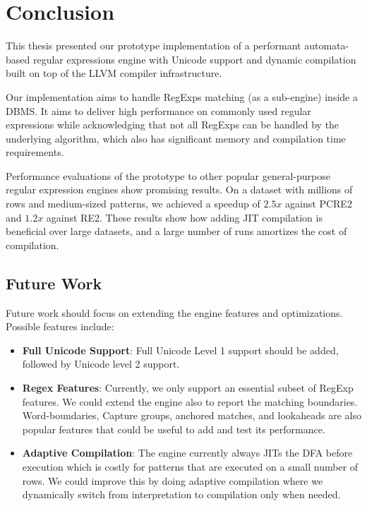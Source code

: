 \chapter{Conclusion}\label{chapter:conclusion}
This thesis presented our prototype implementation of a performant automata-based regular expressions engine with Unicode support and dynamic compilation built on top of the LLVM compiler infrastructure.

Our implementation aims to handle RegExps matching (as a sub-engine) inside a DBMS. It aims to deliver high performance on commonly used regular expressions while acknowledging that not all RegExps can be handled by the underlying algorithm, which also has significant memory and compilation time requirements.

Performance evaluations of the prototype to other popular general-purpose regular expression engines show promising results. On a dataset with millions of rows and medium-sized patterns, we achieved a speedup of $2.5x$ against PCRE2 and $1.2x$ against RE2. These results show how adding JIT compilation is beneficial over large datasets, and a large number of runs amortizes the cost of compilation.

\section{Future Work}\label{futurework}

Future work should focus on extending the engine features and optimizations. Possible features include:
\begin{itemize}
    \item \textbf{Full Unicode Support}: Full Unicode Level 1 support should be added, followed by Unicode level 2 support.
    \item \textbf{Regex Features}: Currently, we only support an essential subset of RegExp features. We could extend the engine also to report the matching boundaries. Word-boundaries, Capture groups, anchored matches, and lookaheads are also popular features that could be useful to add and test its performance.  
    \item \textbf{Adaptive Compilation}: The engine currently always JITs the DFA before execution which is costly for patterns that are executed on a small number of rows. We could improve this by doing adaptive compilation where we dynamically switch from interpretation to compilation only when needed.
\end{itemize}

